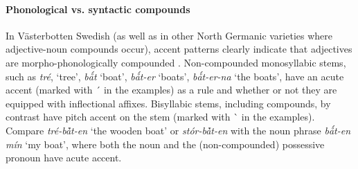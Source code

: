 \paragraph*{Phonological vs. syntactic compounds}
In Västerbotten Swedish (as well as in other North Germanic varieties where adjective-noun compounds occur), accent patterns clearly indicate that adjectives are morpho-phonologically compounded \citep[cf.][]{dahl2003}. Non-compounded monosyllabic stems, such as \textit{tré}, ‘tree’, \textit{bǻt} ‘boat’, \textit{bǻt-er} ‘boats’, \textit{bǻt-er-na} ‘the boats’, have an acute accent (marked with ´ in the examples) as a rule and whether or not they are equipped with inflectional affixes. Bisyllabic stems, including compounds, by contrast have pitch accent on the stem (marked with \`{ } in the examples). Compare \textit{tré-bå̀t-en} ‘the wooden boat’ or \textit{stór-bå̀t-en} with the noun phrase \textit{bǻt-en mín} ‘my boat’, where both the noun and the (non-compounded) possessive pronoun have acute accent.

